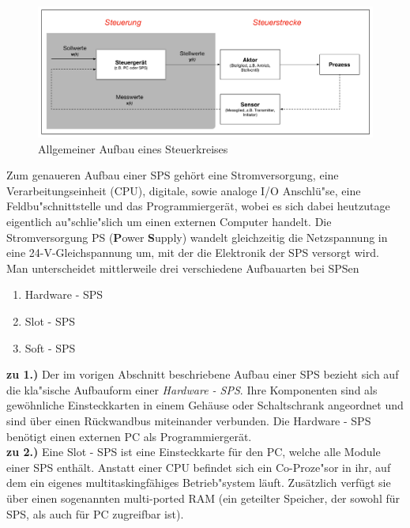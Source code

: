  	\begin{figure}[h!]
  		\centering
      	\includegraphics[width=1\textwidth]{graphics/stateoftheart/Aufbau_Steuerkreis_Selfmade.png}
  		\caption{Allgemeiner Aufbau eines Steuerkreises \cite{mseitz_sps}}
	\end{figure}	
 
 Zum genaueren Aufbau einer SPS gehört eine Stromversorgung, eine Verarbeitungseinheit (CPU), digitale, sowie analoge I/O Anschlü"se, eine Feldbu"schnittstelle und das Programmiergerät, wobei es sich dabei heutzutage eigentlich au"schlie"slich um einen externen Computer handelt. Die Stromversorgung PS (\textbf{P}ower \textbf{S}upply) wandelt gleichzeitig die Netzspannung in eine 24-V-Gleichspannung um, mit der die Elektronik der SPS versorgt wird.\\
	
	Man unterscheidet mittlerweile drei verschiedene Aufbauarten bei SPSen
	
	\begin{enumerate}
  		\item Hardware - SPS
  		\item Slot - SPS
  		\item Soft - SPS
	\end{enumerate}

	\textbf{zu 1.)} Der im vorigen Abschnitt beschriebene Aufbau einer SPS bezieht sich auf die kla"sische Aufbauform einer \textit{Hardware - SPS}. Ihre Komponenten sind als gewöhnliche Einsteckkarten in einem Gehäuse oder Schaltschrank angeordnet und sind über einen Rückwandbus miteinander verbunden. Die Hardware - SPS benötigt einen externen PC als Programmiergerät.\\
	
	\textbf{zu 2.)} Eine Slot - SPS ist eine Einsteckkarte für den PC, welche alle Module einer SPS enthält. Anstatt einer CPU befindet sich ein Co-Proze"sor in ihr, auf dem ein eigenes multitaskingfähiges Betrieb"system läuft. Zusätzlich verfügt sie über einen sogenannten multi-ported RAM (ein geteilter Speicher, der sowohl für SPS, als auch für PC zugreifbar ist).\\
	
